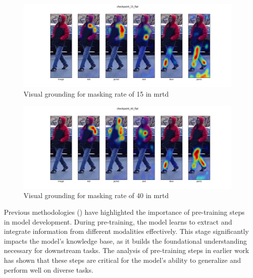 \begin{figure}[htbp]
  \includegraphics[width=\linewidth]{img/mrtd_masking_ratio/mrtd-checkpoint_15_flat.png}
  \caption{Visual grounding for masking rate of 15 in \acrshort{mrtd}}
  \label{fig:mtrd_1}
\end{figure}


\begin{figure}[htbp]
  \includegraphics[width=\linewidth]{img/mrtd_masking_ratio/mrtd-checkpoint_40_flat.png}
  \caption{Visual grounding for masking rate of 40 in \acrshort{mrtd}}
  \label{fig:mtrd_6}
\end{figure}

Previous methodologies (\cite{devlin2018bert}) have highlighted the importance of pre-training steps in model development. During pre-training, the model learns to extract and integrate information from different modalities effectively. This stage significantly impacts the model's knowledge base, as it builds the foundational understanding necessary for downstream tasks. The analysis of pre-training steps in earlier work has shown that these steps are critical for the model's ability to generalize and perform well on diverse tasks.

